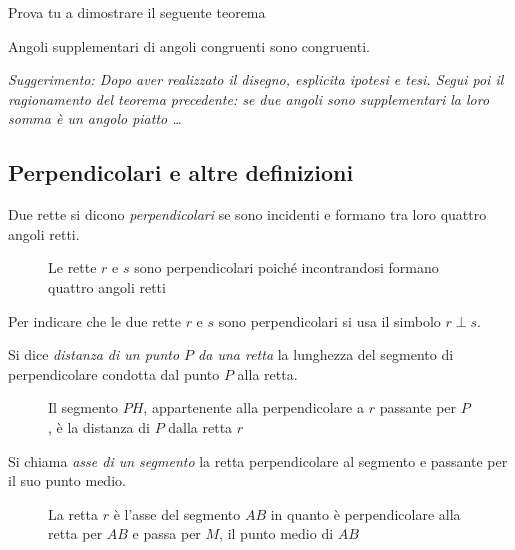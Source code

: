 Prova tu a dimostrare il seguente teorema

\begin{teorema}
Angoli supplementari di angoli congruenti sono congruenti.
\end{teorema}

\emph{Suggerimento: Dopo aver realizzato il disegno, esplicita ipotesi e tesi. Segui poi il ragionamento del teorema precedente: se due angoli sono supplementari la loro somma è un angolo piatto \ldots{}}

\subsection{Perpendicolari e altre definizioni}

\begin{definizione}
Due rette si dicono \emph{perpendicolari} se sono incidenti e formano tra loro quattro angoli retti.
\end{definizione}

\begin{figure}[htb]
\centering
\caption{Le rette $r$ e $s$ sono perpendicolari poiché incontrandosi formano quattro angoli retti}
\end{figure}

Per indicare che le due rette $r$ e $s$ sono perpendicolari si usa il simbolo $r\perp s$.

\begin{definizione}
Si dice \emph{distanza di un punto $P$ da una retta} la lunghezza del segmento di perpendicolare condotta dal punto $P$ alla retta.
\end{definizione}

\begin{figure}[htb]
\centering
\caption{Il segmento $PH$, appartenente alla perpendicolare a $r$ passante per $P$, è la distanza di $P$ dalla retta $r$}
\end{figure}

\begin{definizione}
Si chiama \emph{asse di un segmento} la retta perpendicolare al segmento e passante per il suo punto medio.
\end{definizione}

\begin{figure}[htb]
\centering
\caption{La retta $r$ è l'asse del segmento $AB$ in quanto è perpendicolare alla retta per $AB$ e passa per $M$, il punto medio di $AB$}\label{fig:1.38}
\end{figure}

